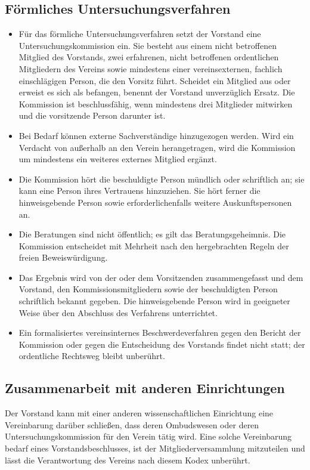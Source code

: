 \documentclass[a4paper, fontsize=11pt]{scrartcl}
\begin{document}
\subsection{Förmliches Untersuchungsverfahren}
\begin{itemize}
  \item Für das förmliche Untersuchungsverfahren setzt der Vorstand eine Untersuchungskommission ein. Sie besteht aus einem nicht betroffenen Mitglied des Vorstands, zwei erfahrenen, nicht betroffenen ordentlichen Mitgliedern des Vereins sowie mindestens einer vereinsexternen, fachlich einschlägigen Person, die den Vorsitz führt. Scheidet ein Mitglied aus oder erweist es sich als befangen, benennt der Vorstand unverzüglich Ersatz. Die Kommission ist beschlussfähig, wenn mindestens drei Mitglieder mitwirken und die vorsitzende Person darunter ist.
  \item Bei Bedarf können externe Sachverständige hinzugezogen werden. Wird ein Verdacht von außerhalb an den Verein herangetragen, wird die Kommission um mindestens ein weiteres externes Mitglied ergänzt.
  \item Die Kommission hört die beschuldigte Person mündlich oder schriftlich an; sie kann eine Person ihres Vertrauens hinzuziehen. Sie hört ferner die hinweisgebende Person sowie erforderlichenfalls weitere Auskunftspersonen an.
  \item Die Beratungen sind nicht öffentlich; es gilt das Beratungsgeheimnis. Die Kommission entscheidet mit Mehrheit nach den hergebrachten Regeln der freien Beweiswürdigung.
  \item Das Ergebnis wird von der oder dem Vorsitzenden zusammengefasst und dem Vorstand, den Kommissionsmitgliedern sowie der beschuldigten Person schriftlich bekannt gegeben. Die hinweisgebende Person wird in geeigneter Weise über den Abschluss des Verfahrens unterrichtet.
  \item Ein formalisiertes vereinsinternes Beschwerdeverfahren gegen den Bericht der Kommission oder gegen die Entscheidung des Vorstands findet nicht statt; der ordentliche Rechtsweg bleibt unberührt.
\end{itemize}

\subsection{Zusammenarbeit mit anderen Einrichtungen}
Der Vorstand kann mit einer anderen wissenschaftlichen Einrichtung eine Vereinbarung darüber schließen, dass deren Ombudswesen oder deren Untersuchungskommission für den Verein tätig wird. Eine solche Vereinbarung bedarf eines Vorstandsbeschlusses, ist der Mitgliederversammlung mitzuteilen und lässt die Verantwortung des Vereins nach diesem Kodex unberührt.
\end{document}
